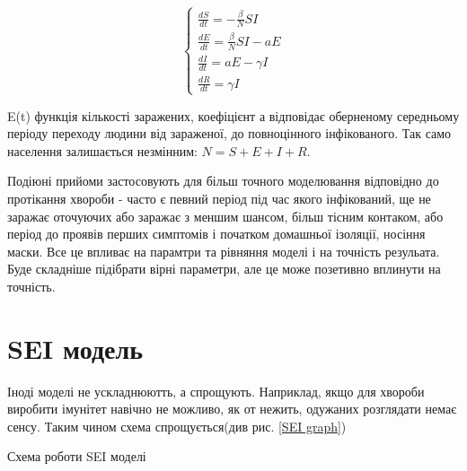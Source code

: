 \begin{equation}
    \begin{cases}
        \frac{dS}{dt} = - \frac{\beta}{N}SI    \\
        \frac{dE}{dt} = \frac{\beta}{N}SI - aE \\
        \frac{dI}{dt} = aE - \gamma I          \\
        \frac{dR}{dt} = \gamma I
    \end{cases}
\end{equation}
\label{SEIR}

E(t) функція кількості заражених, коефіцієнт а відповідає оберненому середньому періоду переходу людини від зараженої, до повноцінного інфікованого.
Так само населення залишається незмінним: $ N = S + E + I + R $.

Подіюні прийоми застосовують для більш точного моделювання відповідно до
протікання хвороби - часто є певний період під час якого інфікований, 
ще не заражає оточуючих або заражає з меншим шансом, більш тісним контаком, 
або період до проявів перших симптомів і початком домашньої ізоляції,
носіння маски. 
Все це впливає на парамтри та рівняння моделі і на точність резульата. 
Буде складніше підібрати вірні параметри, але це може позетивно вплинути на точність.

\section{SEI модель}

Іноді моделі не ускладнюютть, а спрощують. 
Наприклад, якщо для хвороби виробити імунітет навічно не можливо, 
як от нежить, одужаних розглядати немає сенсу. 
Таким чином схема спрощується(див рис. \ref{SEI graph})

\begin{risunok}[ht]
    \centering
    \vspace{0.5cm}
    \caption{Схема роботи SEI моделі}
    \label{SEI graph}
\end{risunok}

